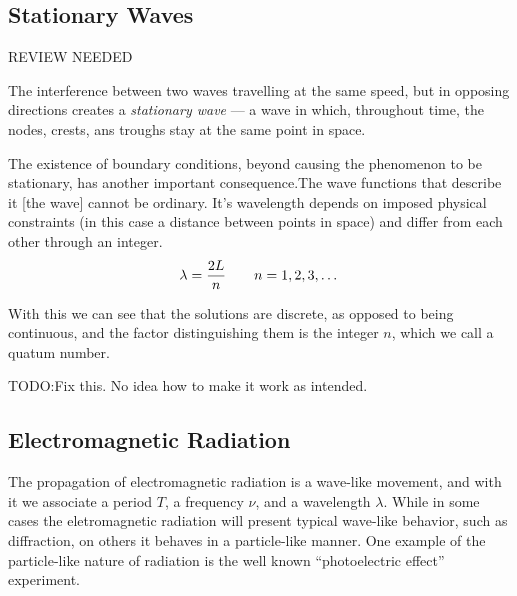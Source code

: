 \documentclass{article}[10pt]
\begin{document}
\subsection{Stationary Waves}
REVIEW NEEDED

The interference between two waves travelling at the same speed, but in opposing
directions creates a \emph{stationary wave} --- a wave in which, throughout
time, the nodes, crests, ans troughs stay at the same point in space.

The existence of boundary conditions, beyond causing the phenomenon to be
stationary, has another important consequence.The wave functions that describe
it [the wave] cannot be ordinary. It's wavelength depends on imposed physical
constraints (in this case a distance between points in space) and differ
from each other through an integer.
\[
	\lambda = \frac{2L}{n} \qquad n=1,2,3,\ldots \\
\]

With this we can see that the solutions are discrete, as opposed to being continuous, and the
factor distinguishing them is the integer $n$, which we call a quatum number.
\begin{figure}[H]
\end{figure}

TODO:\@ Fix this. No idea how to make it work as intended.
\subsection{Electromagnetic Radiation}
The propagation of electromagnetic radiation is a wave-like movement, and with
it we associate a period $T$, a frequency $\nu$, and a wavelength $\lambda$.
While in some cases the eletromagnetic radiation will present typical wave-like
behavior, such as diffraction, on others it behaves in  a particle-like manner.
One example of the particle-like nature of radiation is the well known
``photoelectric effect'' experiment.
\end{document}
